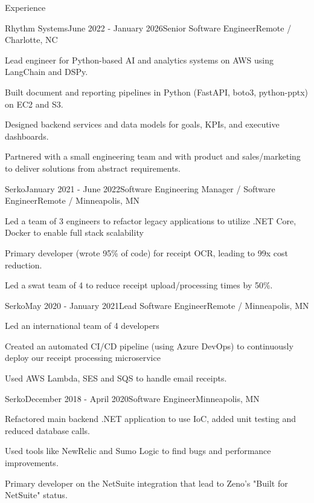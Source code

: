 \documentclass[
	12pt, %
]{resume} %
\begin{document}
\begin{rSection}{Experience}

	
	\begin{rSubsection}{Rhythm Systems}{June 2022 - January 2026}{Senior Software Engineer}{Remote / Charlotte, NC}
		\item Lead engineer for Python-based AI and analytics systems on AWS using LangChain and DSPy.
		\item Built document and reporting pipelines in Python (FastAPI, boto3, python-pptx) on EC2 and S3.
		\item Designed backend services and data models for goals, KPIs, and executive dashboards.
		\item Partnered with a small engineering team and with product and sales/marketing to deliver solutions from abstract requirements.
	\end{rSubsection}




	\begin{rSubsection}{Serko}{January 2021 - June 2022}{Software Engineering Manager / Software Engineer}{Remote / Minneapolis, MN}
		\item Led a team of 3 engineers to refactor legacy applications to utilize .NET Core, Docker to enable full stack scalability	
		\item Primary developer (wrote 95\% of code) for receipt OCR, leading to 99x cost reduction.
		\item Led a swat team of 4 to reduce receipt upload/processing times by 50\%.
	\end{rSubsection}
	\begin{rSubsection}{Serko}{May 2020 - January 2021}{Lead Software Engineer}{Remote / Minneapolis, MN}
		\item Led an international team of 4 developers
		\item Created an automated CI/CD pipeline (using Azure DevOps) to continuously deploy our receipt processing microservice
		\item Used AWS Lambda, SES and SQS to handle email receipts.
	\end{rSubsection}
	\begin{rSubsection}{Serko}{December 2018 - April 2020}{Software Engineer}{Minneapolis, MN}
		\item Refactored main backend .NET application to use IoC, added unit testing and reduced database calls.
		\item Used tools like NewRelic and Sumo Logic to find bugs and performance improvements.
		\item Primary developer on the NetSuite integration that lead to Zeno's "Built for NetSuite" status.
	\end{rSubsection}


\end{rSection}
\end{document}

